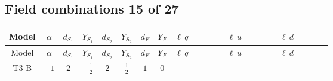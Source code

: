 \documentclass[8pt]{article}
\begin{document}
\begin{landscape}
\subsection*{Field combinations 15 of 27}
\begin{longtable}{@{}cccccccc >{\raggedright\arraybackslash}p{0.21\linewidth} >{\raggedright\arraybackslash}p{0.21\linewidth} >{\raggedright\arraybackslash}p{0.21\linewidth}@{}}
\toprule
Model & $\alpha$ & $d_{S_1}$ & $Y_{S_1}$ & $d_{S_2}$ & $Y_{S_2}$ & $d_F$ & $Y_F$ & $\ell\,q$ & $\ell\,u$ & $\ell\,d$ \\
\midrule
\endfirsthead
\toprule
Model & $\alpha$ & $d_{S_1}$ & $Y_{S_1}$ & $d_{S_2}$ & $Y_{S_2}$ & $d_F$ & $Y_F$ & $\ell\,q$ & $\ell\,u$ & $\ell\,d$ \\
\midrule
\endhead
T3-B & $-1$ & $2$ & $-\frac{1}{2}$ & $2$ & $\frac{1}{2}$ & $1$ & $0$ & \scriptsize\adjustbox{max width=\linewidth}{$\begin{gathered} -\frac{\hbar  \text{Delta}\left(i_1,i_3\right) \overline{L_{a_1,i_3}}\, \gamma ^{\mu _1}\, P_L\, L_{a_2,i_1} \overline{q_{\alpha _1,a_2,i_4}}\, \gamma ^{\mu _1}\, P_L\, q_{\alpha _1,a_1,i_4} g_2^4}{120 m_1^2} \\ +\frac{\hbar  \text{Delta}\left(i_1,i_3\right) \overline{L_{a_1,i_3}}\, \gamma ^{\mu _1}\, P_L\, L_{a_1,i_1} \overline{q_{\alpha _1,a_2,i_4}}\, \gamma ^{\mu _1}\, P_L\, q_{\alpha _1,a_2,i_4} g_2^4}{240 m_1^2} \\ +\frac{\hbar  \overline{y_{1,i_1,r_1}} \overline{L_{a_1,i_3}}\, \gamma ^{\mu _1}\, P_L\, L_{a_2,i_1} \overline{q_{\alpha _1,a_2,i_4}}\, \gamma ^{\mu _1}\, P_L\, q_{\alpha _1,a_1,i_4} y_{1,i_3,r_1} g_2^2}{36 m_1^2}\end{gathered}$} & \scriptsize\adjustbox{max width=\linewidth}{$\begin{gathered} -\frac{\hbar  \overline{y_{1,i_1,r_1}} \overline{L_{a_1,i_3}}\, \gamma ^{\mu _1}\, P_L\, L_{a_1,i_1} \overline{u_{\alpha _1,i_4}}\, \gamma ^{\mu _1}\, P_R\, u_{\alpha _1,i_4} g_1^2 y_{1,i_3,r_1}}{54 m_1^2} \\ +\frac{\hbar  \text{Delta}\left(i_1,i_3\right) \overline{L_{a_1,i_3}}\, \gamma ^{\mu _1}\, P_L\, L_{a_1,i_1} \overline{u_{\alpha _1,i_4}}\, \gamma ^{\mu _1}\, P_R\, u_{\alpha _1,i_4} g_1^4}{180 m_1^2}\end{gathered}$} & \scriptsize\adjustbox{max width=\linewidth}{$\begin{gathered} +\frac{\hbar  \overline{y_{1,i_2,r_1}} \overline{d_{\alpha _1,i_3}}\, \gamma ^{\mu _1}\, P_R\, d_{\alpha _1,i_3} \overline{L_{a_1,i_4}}\, \gamma ^{\mu _1}\, P_L\, L_{a_1,i_2} g_1^2 y_{1,i_4,r_1}}{108 m_1^2} \\ -\frac{\hbar  \text{Delta}\left(i_2,i_4\right) \overline{d_{\alpha _1,i_3}}\, \gamma ^{\mu _1}\, P_R\, d_{\alpha _1,i_3} \overline{L_{a_1,i_4}}\, \gamma ^{\mu _1}\, P_L\, L_{a_1,i_2} g_1^4}{360 m_1^2}\end{gathered}$} \\

\end{longtable}
\end{landscape}
\end{document}
